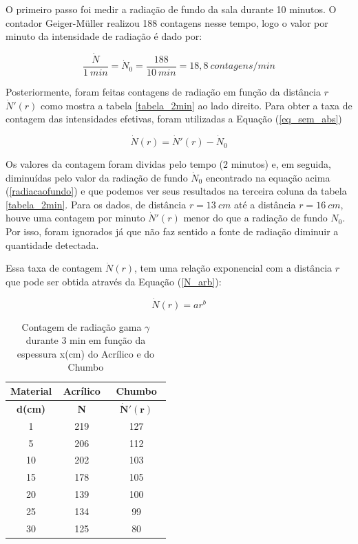 \documentclass{article}
\begin{document}
O primeiro passo foi medir a radiação de fundo da sala durante 10 minutos. O contador Geiger-Müller realizou 188 contagens nesse tempo, logo o valor por minuto da intensidade de radiação é dado por:

\begin{equation}
    \label{radiacaofundo}
    \frac{\dot N}{1 \ min} =\dot N _0 =\frac{188}{10 \ min} = 18,8 \ contagens/min
\end{equation}

Posteriormente, foram feitas contagens de radiação em função da distância $r$ $\dot N'(r)$ como mostra a tabela \ref{tabela_2min} ao lado direito. Para obter a taxa de contagem das intensidades efetivas, foram utilizadas a Equação (\ref{eq_sem_abs}) 

\begin{equation}
    \label{eq_sem_abs}
    \dot N(r) = \dot N'(r) - \dot N _0
\end{equation}

Os valores da contagem foram dividas pelo tempo (2 minutos) e, em seguida, diminuídas pelo valor da radiação de fundo $\dot N _0$ encontrado na equação acima (\ref{radiacaofundo}) e que podemos ver seus resultados na terceira coluna da tabela \ref{tabela_2min}.  Para os dados, de distância $r = 13 \ cm$ até a distância $r = 16 \ cm$, houve uma contagem por minuto $\dot N'(r)$ menor do que a radiação de fundo $N _0$. Por isso, foram ignorados já que não faz sentido a fonte de radiação diminuir a quantidade detectada.

Essa taxa de contagem $\dot N(r)$, tem uma relação exponencial com a distância $r$ que pode ser obtida através da Equação (\ref{N_arb}):


\begin{equation}
    \label{N_arb}
    \dot N(r) = ar^b
\end{equation}

\begin{table}
    \centering
    \begin{tabular}{|c|c|c|}
    \hline
    \cellcolor{cinzaclaro}\textbf{Material} & \cellcolor{cinzaclaro}\textbf{Acrílico} & \cellcolor{cinzaclaro}\textbf{Chumbo} \\ \hline
\cellcolor[HTML]{CFCFCF}\textbf{d(cm)} & \cellcolor[HTML]{CFCFCF}~ ~ \textbf{N} ~ ~  & \cellcolor[HTML]{CFCFCF}~ {$\mathbf{\dot N'(r)}$}  ~  \\ \hline
1     & 219         & 127         \\ \hline
5     & 206         & 112         \\ \hline
10   & 202          & 103         \\ \hline
15    & 178         & 105         \\ \hline
20    & 139         & 100         \\ \hline
25    & 134         & 99          \\ \hline
30    & 125         & 80          \\ \hline
    \end{tabular}
    \caption{Contagem de radiação gama $\gamma$ durante 3 min em função da espessura x(cm) do Acrílico e do Chumbo }
    \label{tabela_absorvedor}
\end{table}
\end{document}
